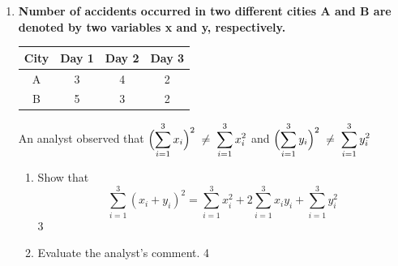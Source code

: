\documentclass[a4paper,oneside]{book}
\begin{document}
\begin{enumerate}
 \item
  \textbf{Number of accidents occurred in two different cities A and B are denoted by two variables x and y, respectively.} 
  
  \begin{table}[h]
  \centering
\begin{tabular}{c|c|c|c}
City & Day 1 & Day 2 & Day 3 \\ \hline
A    & 3     & 4     & 2     \\
B    & 5     & 3     & 2    
\end{tabular}
\end{table}
  
  An analyst observed that $\displaystyle \Bigl(\sum_{i=1}^{3} x_i\Bigr)^2 \;\neq\; \sum_{i=1}^{3} x_i^2$ and  $\displaystyle \Bigl(\sum_{i=1}^{3} y_i\Bigr)^2 \;\neq\; \sum_{i=1}^{3} y_i^2$
  
  \begin{enumerate}
    \item  Show that 
	\[
\sum_{i=1}^{3} (x_i + y_i)^2 = \sum_{i=1}^{3} x_i^2 + 2\sum_{i=1}^{3} x_i y_i + \sum_{i=1}^{3} y_i^2
\] \hfill 3
    \item
	Evaluate the analyst's comment. \hfill 4
  \end{enumerate}
  
  \end{enumerate}
\end{document}
